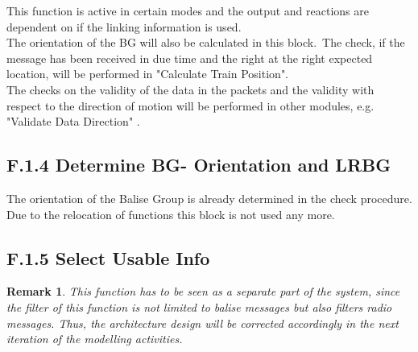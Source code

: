 \documentclass{template/openetcs_report}
\newtheorem{remark}{Remark}
\begin{document}
This function is active in certain modes and the output and reactions are dependent on if the linking information is used.\\
The orientation of the BG will also be calculated in this block.\
The check, if the message has been received in due time and the right at the right expected location, will be performed in "Calculate Train Position".\\
The checks on the validity of the data in the packets and the validity with respect to the direction of motion will be performed in other modules, e.g. "Validate Data Direction" .

\subsection{F.1.4 Determine BG- Orientation and LRBG}

The orientation of the Balise Group is already determined in the check procedure. Due to the relocation of functions this block is not used any more.


\subsection{F.1.5 Select Usable Info}
\begin{remark}
This function has to be seen as a separate part of the system, since the filter of this function is not limited to balise messages but also filters radio messages. Thus, the architecture design will be corrected accordingly in the next iteration of the modelling activities.
\end{remark}
\end{document}
